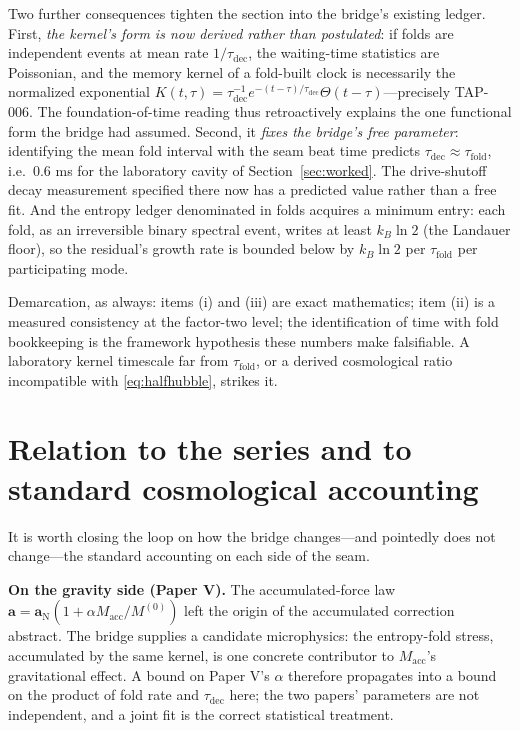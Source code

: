 \documentclass[11pt]{article}
\theoremstyle{remark}
\begin{document}
Two further consequences tighten the section into the bridge's existing ledger. First, \emph{the kernel's form is now derived rather than postulated}: if folds are independent events at mean rate $1/\tau_{\mathrm{dec}}$, the waiting-time statistics are Poissonian, and the memory kernel of a fold-built clock is necessarily the normalized exponential $K(t,\tau) = \tau_{\mathrm{dec}}^{-1} e^{-(t-\tau)/\tau_{\mathrm{dec}}}\Theta(t-\tau)$---precisely TAP-006. The foundation-of-time reading thus retroactively explains the one functional form the bridge had assumed. Second, it \emph{fixes the bridge's free parameter}: identifying the mean fold interval with the seam beat time predicts $\tau_{\mathrm{dec}} \approx \tau_{\mathrm{fold}}$, i.e.\ $0.6$ ms for the laboratory cavity of Section~\ref{sec:worked}. The drive-shutoff decay measurement specified there now has a predicted value rather than a free fit. And the entropy ledger denominated in folds acquires a minimum entry: each fold, as an irreversible binary spectral event, writes at least $k_B \ln 2$ (the Landauer floor), so the residual's growth rate is bounded below by $k_B \ln 2$ per $\tau_{\mathrm{fold}}$ per participating mode.

Demarcation, as always: items (i) and (iii) are exact mathematics; item (ii) is a measured consistency at the factor-two level; the identification of time with fold bookkeeping is the framework hypothesis these numbers make falsifiable. A laboratory kernel timescale far from $\tau_{\mathrm{fold}}$, or a derived cosmological ratio incompatible with \eqref{eq:halfhubble}, strikes it.

\section{Relation to the series and to standard cosmological accounting}
\label{sec:relation}

It is worth closing the loop on how the bridge changes---and pointedly does not change---the standard accounting on each side of the seam.

\textbf{On the gravity side (Paper V).} The accumulated-force law $\mathbf{a} = \mathbf{a}_{\mathrm{N}}(1 + \alpha M_{\mathrm{acc}}/M^{(0)})$ left the origin of the accumulated correction abstract. The bridge supplies a candidate microphysics: the entropy-fold stress, accumulated by the same kernel, is one concrete contributor to $M_{\mathrm{acc}}$'s gravitational effect. A bound on Paper V's $\alpha$ therefore propagates into a bound on the product of fold rate and $\tau_{\mathrm{dec}}$ here; the two papers' parameters are not independent, and a joint fit is the correct statistical treatment.
\end{document}
